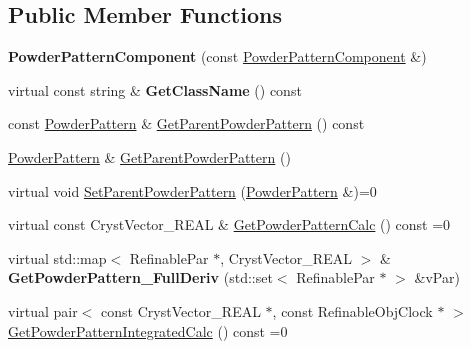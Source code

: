 \subsection*{Public Member Functions}
\begin{DoxyCompactItemize}
\item 
\mbox{\label{class_obj_cryst_1_1_powder_pattern_component_a10afd347f725df06fa8fabf94ee9c90f}} 
{\bfseries Powder\+Pattern\+Component} (const \mbox{\hyperlink{class_obj_cryst_1_1_powder_pattern_component}{Powder\+Pattern\+Component}} \&)
\item 
\mbox{\label{class_obj_cryst_1_1_powder_pattern_component_a270a93cc584d7a1be9db943d57513cff}} 
virtual const string \& {\bfseries Get\+Class\+Name} () const
\item 
const \mbox{\hyperlink{class_obj_cryst_1_1_powder_pattern}{Powder\+Pattern}} \& \mbox{\hyperlink{class_obj_cryst_1_1_powder_pattern_component_a7428c062c1cb6d5f21d1e4131a917199}{Get\+Parent\+Powder\+Pattern}} () const
\item 
\mbox{\hyperlink{class_obj_cryst_1_1_powder_pattern}{Powder\+Pattern}} \& \mbox{\hyperlink{class_obj_cryst_1_1_powder_pattern_component_af381cfddfcb2a21563c4e1c10fd9cf33}{Get\+Parent\+Powder\+Pattern}} ()
\item 
virtual void \mbox{\hyperlink{class_obj_cryst_1_1_powder_pattern_component_a6b3dc911118c280dbbdcb7fb97acf980}{Set\+Parent\+Powder\+Pattern}} (\mbox{\hyperlink{class_obj_cryst_1_1_powder_pattern}{Powder\+Pattern}} \&)=0
\item 
virtual const Cryst\+Vector\+\_\+\+R\+E\+AL \& \mbox{\hyperlink{class_obj_cryst_1_1_powder_pattern_component_a45258e9f9b44ff019bf53aa3dfb1a305}{Get\+Powder\+Pattern\+Calc}} () const =0
\item 
\mbox{\label{class_obj_cryst_1_1_powder_pattern_component_a49944e75282a231127768b224df795b9}} 
virtual std\+::map$<$ Refinable\+Par $\ast$, Cryst\+Vector\+\_\+\+R\+E\+AL $>$ \& {\bfseries Get\+Powder\+Pattern\+\_\+\+Full\+Deriv} (std\+::set$<$ Refinable\+Par $\ast$ $>$ \&v\+Par)
\item 
virtual pair$<$ const Cryst\+Vector\+\_\+\+R\+E\+AL $\ast$, const Refinable\+Obj\+Clock $\ast$ $>$ \mbox{\hyperlink{class_obj_cryst_1_1_powder_pattern_component_ac54b7ae5a177492de681afc2cbed72eb}{Get\+Powder\+Pattern\+Integrated\+Calc}} () const =0

\end{DoxyCompactItemize}
